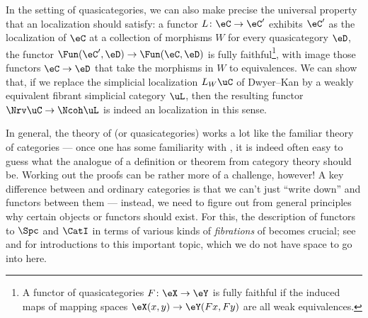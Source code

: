 \documentclass[a4paper,12pt]{article}
\begin{document}
\begin{remark}
  In the setting of quasicategories, we can also make precise the
  universal property that an \icatl{} localization should satisfy: a
  functor $L \colon \eC \to \eC'$ exhibits $\eC'$ as the localization
  of $\eC$ at a collection of morphisms $W$ \IFF{} for every
  quasicategory $\eD$, the functor
  $\Fun(\eC', \eD) \to \Fun(\eC, \eD)$ is fully faithful\footnote{A
    functor of quasicategories $F \colon \eX \to \eY$ is fully
    faithful if the induced maps of mapping spaces
    $\eX(x,y) \to \eY(Fx,Fy)$ are all weak equivalences.}, with image
  those functors $\eC \to \eD$ that take the morphisms in $W$ to
  equivalences. We can show that, if we replace the simplicial
  localization $L_{W}\uC$ of Dwyer--Kan by a weakly equivalent fibrant
  simplicial category $\uL$, then the resulting functor
  $\Nrv \uC \to \Ncoh \uL$ is indeed an \icatl{} localization in this
  sense.
\end{remark}

\begin{remark}
  In general, the theory of \icats{} (or quasicategories) works a lot
  like the familiar theory of categories --- once one has some
  familiarity with \icats{}, it is indeed often easy to guess what the
  \icatl{} analogue of a definition or theorem from category theory
  should be. Working out the proofs can be rather more of a challenge,
  however! A key difference between \icats{} and ordinary categories
  is that we can't just ``write down'' \icats{} and functors between
  them --- instead, we need to figure out from general principles why
  certain objects or functors should exist. For this, the description
  of functors to $\Spc$ and $\CatI$ in terms of various kinds of
  \emph{fibrations} of \icats{} becomes crucial; see \cite{BarwickShah}
  and \cite{MazelGee}
  for introductions to this important topic,
  which we do not have space to go into here.
\end{remark}
\end{document}

